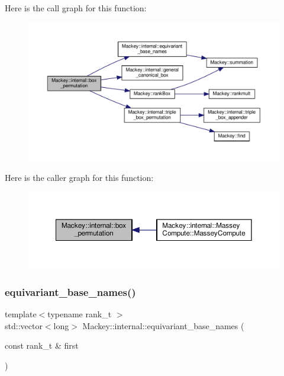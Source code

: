 Here is the call graph for this function\+:\nopagebreak
\begin{figure}[H]
\begin{center}
\leavevmode
\includegraphics[width=350pt]{namespaceMackey_1_1internal_a4b352efa632d7cfab147b728a0d39491_cgraph}
\end{center}
\end{figure}
Here is the caller graph for this function\+:\nopagebreak
\begin{figure}[H]
\begin{center}
\leavevmode
\includegraphics[width=350pt]{namespaceMackey_1_1internal_a4b352efa632d7cfab147b728a0d39491_icgraph}
\end{center}
\end{figure}
\mbox{\label{namespaceMackey_1_1internal_ad3470eee0665ddd466ea1fc98adffd7c}} 
\subsubsection{\texorpdfstring{equivariant\+\_\+base\+\_\+names()}{equivariant\_base\_names()}}
{\footnotesize\ttfamily template$<$typename rank\+\_\+t $>$ \\
std\+::vector$<$long$>$ Mackey\+::internal\+::equivariant\+\_\+base\+\_\+names (\begin{DoxyParamCaption}\item[{const rank\+\_\+t \&}]{first }\end{DoxyParamCaption})}



